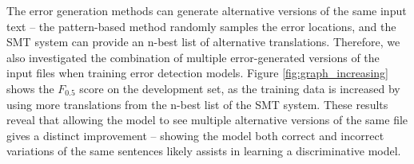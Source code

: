 \documentclass[11pt,letterpaper]{article}
\begin{document}
The error generation methods can generate alternative versions of the same input text -- the pattern-based method randomly samples the error locations, and the SMT system can provide an n-best list of alternative translations. Therefore, we also investigated the combination of multiple error-generated versions of the input files when training error detection models.
Figure \ref{fig:graph_increasing} shows the $F_{0.5}$ score on the development set, as the training data is increased by using more translations from the n-best list of the SMT system. 
These results reveal that allowing the model to see multiple alternative versions of the same file gives a distinct improvement -- showing the model both correct and incorrect variations of the same sentences likely assists in learning a discriminative model.

\end{document}
